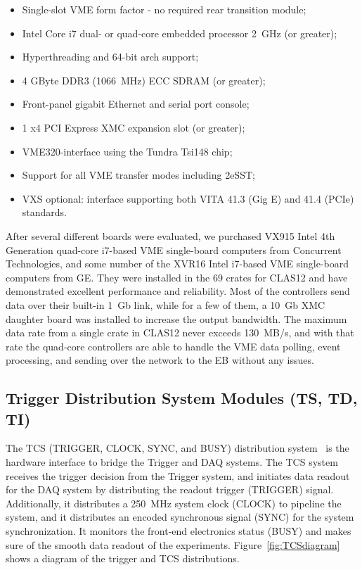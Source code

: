 \begin{itemize}
	\item Single-slot VME form factor - no required rear transition module;
	\item Intel Core i7 dual- or quad-core embedded processor 2~GHz (or greater);
	\item Hyperthreading and 64-bit arch support;
	\item 4 GByte DDR3 (1066~MHz) ECC SDRAM (or greater);
	\item Front-panel gigabit Ethernet and serial port console;
	\item 1 x4 PCI Express XMC expansion slot (or greater);
	\item VME320-interface using the Tundra Tsi148 chip;
	\item Support for all VME transfer modes including 2eSST;
	\item VXS optional: interface supporting both VITA 41.3 (Gig E) and 41.4 (PCIe) standards.
\end{itemize}

After several different boards were evaluated, we purchased VX915 Intel 4th Generation quad-core i7-based VME
single-board computers from Concurrent Technologies, and some number of the XVR16 Intel i7-based VME single-board
computers from GE. They were installed in the 69 crates for CLAS12 and have demonstrated excellent performance and
reliability. Most of the controllers send data over their built-in 1~Gb link, while for a few of them, a 10~Gb XMC daughter
board was installed to increase the output bandwidth. The maximum data rate from a single crate in CLAS12 never
exceeds 130~MB/s, and with that rate the quad-core controllers are able to handle the VME data polling, event processing,
and sending over the network to the EB without any issues. 

\subsection{Trigger Distribution System Modules (TS, TD, TI)}
	
The TCS (TRIGGER, CLOCK, SYNC, and BUSY) distribution system~\cite{tcs-ref} is the hardware interface to bridge
the Trigger and DAQ systems.  The TCS system receives the trigger decision from the Trigger system, and initiates
data readout for the DAQ system by distributing the readout trigger (TRIGGER) signal.  Additionally, it distributes a
250~MHz system clock (CLOCK) to pipeline the system, and it distributes an encoded synchronous signal (SYNC) for
the system synchronization.  It monitors the front-end electronics status (BUSY) and makes sure of the smooth data
readout of the experiments. Figure~\ref{fig:TCSdiagram} shows a diagram of the trigger and TCS distributions.

